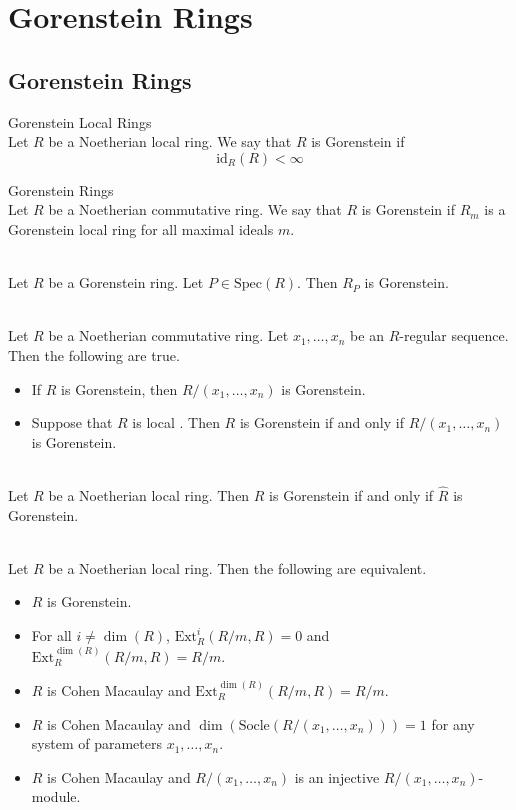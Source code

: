\documentclass[a4paper]{article}
\begin{document}
\pagebreak
\section{Gorenstein Rings}
\subsection{Gorenstein Rings}
\begin{defn}{Gorenstein Local Rings}{}\\
Let $R$ be a Noetherian local ring. We say that $R$ is Gorenstein if $$\text{id}_R(R)<\infty$$
\end{defn}

\begin{defn}{Gorenstein Rings}{}\\
Let $R$ be a Noetherian commutative ring. We say that $R$ is Gorenstein if $R_m$ is a Gorenstein local ring for all maximal ideals $m$. 
\end{defn}

\begin{prp}{}{}\\
Let $R$ be a Gorenstein ring. Let $P\in\text{Spec}(R)$. Then $R_P$ is Gorenstein. 
\end{prp}

\begin{prp}{}{}\\
Let $R$ be a Noetherian commutative ring. Let $x_1,\dots,x_n$ be an $R$-regular sequence. Then the following are true. 
\begin{itemize}
\item If $R$ is Gorenstein, then $R/(x_1,\dots,x_n)$ is Gorenstein. 
\item Suppose that $R$ is local . Then $R$ is Gorenstein if and only if $R/(x_1,\dots,x_n)$ is Gorenstein. 
\end{itemize}
\end{prp}

\begin{prp}{}{}\\
Let $R$ be a Noetherian local ring. Then $R$ is Gorenstein if and only if $\widehat{R}$ is Gorenstein. 
\end{prp}

\begin{prp}{}{}\\
Let $R$ be a Noetherian local ring. Then the following are equivalent. 
\begin{itemize}
\item $R$ is Gorenstein. 
\item For all $i\neq\dim(R)$, $\text{Ext}_R^i(R/m,R)=0$ and $\text{Ext}_R^{\dim(R)}(R/m,R)=R/m$. 
\item $R$ is Cohen Macaulay and $\text{Ext}_R^{\dim(R)}(R/m,R)=R/m$. 
\item $R$ is Cohen Macaulay and $\dim(\text{Socle}(R/(x_1,\dots,x_n)))=1$ for any system of parameters $x_1,\dots,x_n$. 
\item $R$ is Cohen Macaulay and $R/(x_1,\dots,x_n)$ is an injective $R/(x_1,\dots,x_n)$-module. 
\end{itemize}
\end{prp}
\end{document}

